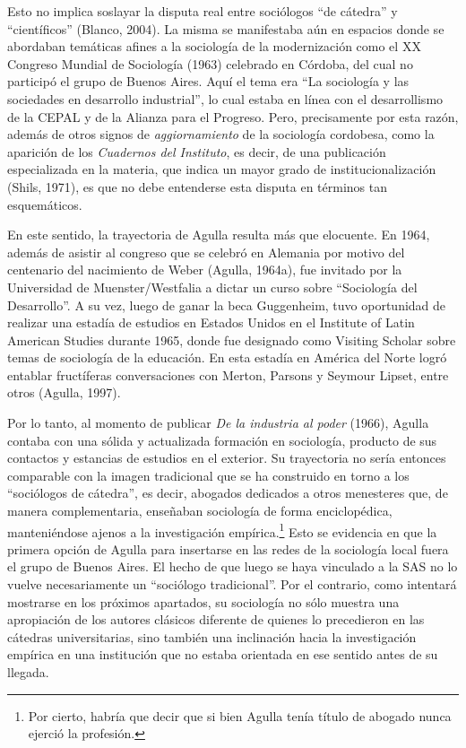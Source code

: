 Esto no implica soslayar la disputa real entre sociólogos ``de cátedra'' y ``científicos'' (Blanco, 2004). La misma se manifestaba aún en espacios donde se abordaban temáticas afines a la sociología de la modernización como el XX Congreso Mundial de Sociología (1963) celebrado en Córdoba, del cual no participó el grupo de Buenos Aires. Aquí el tema era ``La sociología y las sociedades en desarrollo industrial'', lo cual estaba en línea con el desarrollismo de la CEPAL y de la Alianza para el Progreso. Pero, precisamente por esta razón, además de otros signos de \emph{aggiornamiento} de la sociología cordobesa, como la aparición de los \emph{Cuadernos del Instituto}, es decir, de una publicación especializada en la materia, que indica un mayor grado de institucionalización (Shils, 1971), es que no debe entenderse esta disputa en términos tan esquemáticos.

En este sentido, la trayectoria de Agulla resulta más que elocuente. En 1964, además de asistir al congreso que se celebró en Alemania por motivo del centenario del nacimiento de Weber (Agulla, 1964a), fue invitado por la Universidad de Muenster/Westfalia a dictar un curso sobre ``Sociología del Desarrollo''. A su vez, luego de ganar la beca Guggenheim, tuvo oportunidad de realizar una estadía de estudios en Estados Unidos en el Institute of Latin American Studies durante 1965, donde fue designado como Visiting Scholar sobre temas de sociología de la educación. En esta estadía en América del Norte logró entablar fructíferas conversaciones con Merton, Parsons y Seymour Lipset, entre otros (Agulla, 1997).

Por lo tanto, al momento de publicar \emph{De la industria al poder} (1966), Agulla contaba con una sólida y actualizada formación en sociología, producto de sus contactos y estancias de estudios en el exterior. Su trayectoria no sería entonces comparable con la imagen tradicional que se ha construido en torno a los ``sociólogos de cátedra'', es decir, abogados dedicados a otros menesteres que, de manera complementaria, enseñaban sociología de forma enciclopédica, manteniéndose ajenos a la investigación empírica.\footnote{Por cierto, habría que decir que si bien Agulla tenía título de abogado nunca ejerció la profesión.} Esto se evidencia en que la primera opción de Agulla para insertarse en las redes de la sociología local fuera el grupo de Buenos Aires. El hecho de que luego se haya vinculado a la SAS no lo vuelve necesariamente un ``sociólogo tradicional''. Por el contrario, como intentará mostrarse en los próximos apartados, su sociología no sólo muestra una apropiación de los autores clásicos diferente de quienes lo precedieron en las cátedras universitarias, sino también una inclinación hacia la investigación empírica en una institución que no estaba orientada en ese sentido antes de su llegada.

